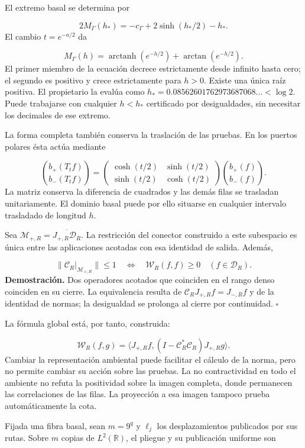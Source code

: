 El extremo basal se determina por

\[
2M_\Gamma(h_*)=-c_\Gamma+2\sinh(h_*/2)-h_*.
\]
El cambio \(t=e^{-a/2}\) da

\[
M_\Gamma(h)=\operatorname{arctanh}(e^{-h/2})
+\arctan(e^{-h/2}).
\]
El primer miembro de la ecuación decrece estrictamente desde infinito hasta cero; el segundo es positivo y crece estrictamente para \(h>0\). Existe una única raíz positiva. El propietario la evalúa como \(h_*=0.08562601762973687068\ldots<\log2\). Puede trabajarse con cualquier \(h<h_*\) certificado por desigualdades, sin necesitar los decimales de ese extremo.

La forma completa también conserva la traslación de las pruebas. En los puertos polares ésta actúa mediante

\[
\binom{b_+(T_tf)}{b_-(T_tf)}=
\begin{pmatrix}\cosh(t/2)&\sinh(t/2)\\
\sinh(t/2)&\cosh(t/2)\end{pmatrix}
\binom{b_+(f)}{b_-(f)}.
\]
La matriz conserva la diferencia de cuadrados y las demás filas se trasladan unitariamente. El dominio basal puede por ello situarse en cualquier intervalo trasladado de longitud \(h\).

Sea \(\mathcal M_{+,R}=\overline{J_{+,R}\mathcal D_R}\). La restricción del conector construido a este subespacio es única entre las aplicaciones acotadas con esa identidad de salida. Además,

\[
\|\mathcal C_R|_{\mathcal M_{+,R}}\|\leq1
\quad\Longleftrightarrow\quad
\mathscr W_R(f,f)\geq0\quad(f\in\mathcal D_R).
\]
\textbf{Demostración.} Dos operadores acotados que coinciden en el rango denso coinciden en su cierre. La equivalencia resulta de \(\mathcal C_RJ_{+,R}f=J_{-,R}f\) y de la identidad de normas; la desigualdad se prolonga al cierre por continuidad. \hfill\(\square\)

La fórmula global está, por tanto, construida:

\[
\mathscr W_R(f,g)=
\langle J_{+,R}f,(I-\mathcal C_R^*\mathcal C_R)J_{+,R}g\rangle.
\]
Cambiar la representación ambiental puede facilitar el cálculo de la norma, pero no permite cambiar su acción sobre las pruebas. La no contractividad en todo el ambiente no refuta la positividad sobre la imagen completa, donde permanecen las correlaciones de las filas. La proyección a esa imagen tampoco prueba automáticamente la cota.

Fijada una fibra basal, sean \(m=9^q\) y \(\ell_j\) los desplazamientos publicados por sus rutas. Sobre \(m\) copias de \(L^2(\mathbb R)\), el pliegue y su publicación uniforme son

